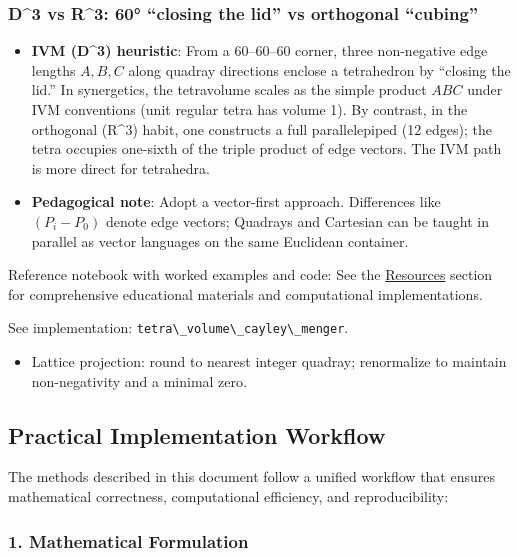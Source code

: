 \documentclass[
  10pt,
]{article}
\newcommand{\passthrough}[1]{#1}
\providecommand{\tightlist}{%
  \setlength{\itemsep}{0pt}\setlength{\parskip}{0pt}}
\begin{document}
\hypertarget{d3-vs-r3-60-closing-the-lid-vs-orthogonal-cubing}{%
\subsubsection{D\^{}3 vs R\^{}3: 60° ``closing the lid'' vs orthogonal
``cubing''}\label{d3-vs-r3-60-closing-the-lid-vs-orthogonal-cubing}}

\begin{itemize}
\tightlist
\item
  \textbf{IVM (D\^{}3) heuristic}: From a 60--60--60 corner, three
  non-negative edge lengths \(A,B,C\) along quadray directions enclose a
  tetrahedron by ``closing the lid.'' In synergetics, the tetravolume
  scales as the simple product \(ABC\) under IVM conventions (unit
  regular tetra has volume 1). By contrast, in the orthogonal (R\^{}3)
  habit, one constructs a full parallelepiped (12 edges); the tetra
  occupies one-sixth of the triple product of edge vectors. The IVM path
  is more direct for tetrahedra.
\item
  \textbf{Pedagogical note}: Adopt a vector-first approach. Differences
  like \((P_i-P_0)\) denote edge vectors; Quadrays and Cartesian can be
  taught in parallel as vector languages on the same Euclidean
  container.
\end{itemize}

Reference notebook with worked examples and code: See the
\href{07_resources.md}{Resources} section for comprehensive educational
materials and computational implementations.

See implementation:
\passthrough{\lstinline!tetra\_volume\_cayley\_menger!}.

\begin{itemize}
\tightlist
\item
  Lattice projection: round to nearest integer quadray; renormalize to
  maintain non-negativity and a minimal zero.
\end{itemize}

\hypertarget{practical-implementation-workflow}{%
\subsection{Practical Implementation
Workflow}\label{practical-implementation-workflow}}

The methods described in this document follow a unified workflow that
ensures mathematical correctness, computational efficiency, and
reproducibility:

\hypertarget{mathematical-formulation}{%
\subsubsection{1. Mathematical
Formulation}\label{mathematical-formulation}}
\end{document}
